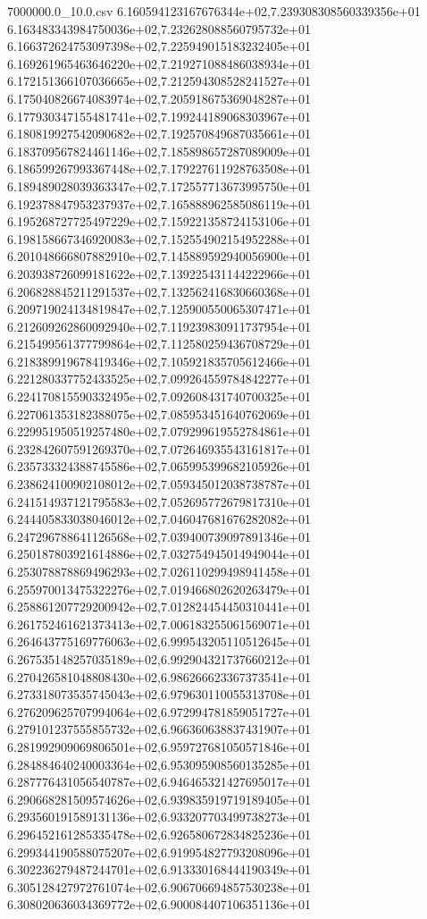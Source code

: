 \begin{filecontents*}{7000000.0_10.0.csv}
6.160594123167676344e+02,7.239308308560339356e+01
6.163483343984750036e+02,7.232628088560795732e+01
6.166372624753097398e+02,7.225949015183232405e+01
6.169261965463646220e+02,7.219271088486038934e+01
6.172151366107036665e+02,7.212594308528241527e+01
6.175040826674083974e+02,7.205918675369048287e+01
6.177930347155481741e+02,7.199244189068303967e+01
6.180819927542090682e+02,7.192570849687035661e+01
6.183709567824461146e+02,7.185898657287089009e+01
6.186599267993367448e+02,7.179227611928763508e+01
6.189489028039363347e+02,7.172557713673995750e+01
6.192378847953237937e+02,7.165888962585086119e+01
6.195268727725497229e+02,7.159221358724153106e+01
6.198158667346920083e+02,7.152554902154952288e+01
6.201048666807882910e+02,7.145889592940056900e+01
6.203938726099181622e+02,7.139225431144222966e+01
6.206828845211291537e+02,7.132562416830660368e+01
6.209719024134819847e+02,7.125900550065307471e+01
6.212609262860092940e+02,7.119239830911737954e+01
6.215499561377799864e+02,7.112580259436708729e+01
6.218389919678419346e+02,7.105921835705612466e+01
6.221280337752433525e+02,7.099264559784842277e+01
6.224170815590332495e+02,7.092608431740700325e+01
6.227061353182388075e+02,7.085953451640762069e+01
6.229951950519257480e+02,7.079299619552784861e+01
6.232842607591269370e+02,7.072646935543161817e+01
6.235733324388745586e+02,7.065995399682105926e+01
6.238624100902108012e+02,7.059345012038738787e+01
6.241514937121795583e+02,7.052695772679817310e+01
6.244405833038046012e+02,7.046047681676282082e+01
6.247296788641126568e+02,7.039400739097891346e+01
6.250187803921614886e+02,7.032754945014949044e+01
6.253078878869496293e+02,7.026110299498941458e+01
6.255970013475322276e+02,7.019466802620263479e+01
6.258861207729200942e+02,7.012824454450310441e+01
6.261752461621373413e+02,7.006183255061569071e+01
6.264643775169776063e+02,6.999543205110512645e+01
6.267535148257035189e+02,6.992904321737660212e+01
6.270426581048808430e+02,6.986266623367373541e+01
6.273318073535745043e+02,6.979630110055313708e+01
6.276209625707994064e+02,6.972994781859051727e+01
6.279101237555855732e+02,6.966360638837431907e+01
6.281992909069806501e+02,6.959727681050571846e+01
6.284884640240003364e+02,6.953095908560135285e+01
6.287776431056540787e+02,6.946465321427695017e+01
6.290668281509574626e+02,6.939835919719189405e+01
6.293560191589131136e+02,6.933207703499738273e+01
6.296452161285335478e+02,6.926580672834825236e+01
6.299344190588075207e+02,6.919954827793208096e+01
6.302236279487244701e+02,6.913330168444190349e+01
6.305128427972761074e+02,6.906706694857530238e+01
6.308020636034369772e+02,6.900084407106351136e+01

\end{filecontents*}
